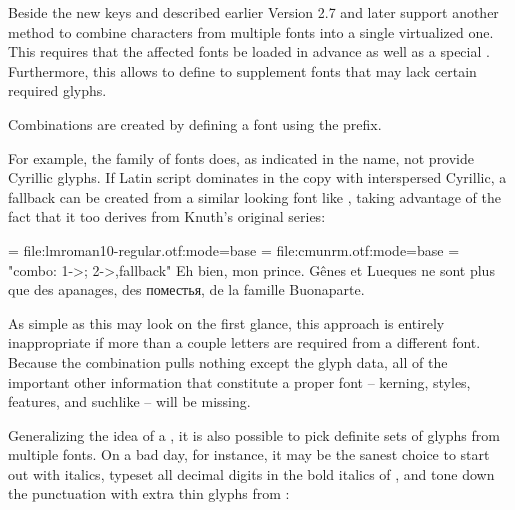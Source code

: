 \enddescriptions

\endsubsection

\endsection

Beside the new keys  and  described earlier
Version 2.7 and later support another method to combine characters from multiple fonts into a
single virtualized one. This requires that the affected fonts be loaded in
advance as well as a special . Furthermore, this
allows to define  to supplement fonts that may lack
certain required glyphs.

Combinations are created by defining a font using the  prefix.


For example, the  family of fonts does, as indicated
in the name, not provide Cyrillic glyphs. If Latin script dominates in the copy
with interspersed Cyrillic, a fallback can be created from a similar looking
font like , taking advantage of the fact
that it too derives from Knuth’s original  series:

\beginlisting
  
  \font \lm  = file:lmroman10-regular.otf:mode=base
  \font \cmu = file:cmunrm.otf:mode=base
  \font \lmu = "combo: 1->\fontid\lm; 2->\fontid\cmu,fallback"
  \lmu Eh bien, mon prince. Gênes et Lueques ne sont plus que des
       apanages, des поместья, de la famille Buonaparte.
  \bye
\endlisting

As simple as this may look on the first glance, this approach is entirely
inappropriate if more than a couple letters are required from a different font.
Because the combination pulls nothing except the glyph data, all of the
important other information that constitute a proper font -- kerning, styles,
features, and suchlike -- will be missing.

\endsubsection %


Generalizing the idea of a , it is also possible to
pick definite sets of glyphs from multiple fonts. On a bad day, for instance,
it may be the sanest choice to start out with  italics,
typeset all decimal digits in the bold italics of ,
and tone down the punctuation with extra thin glyphs from :

